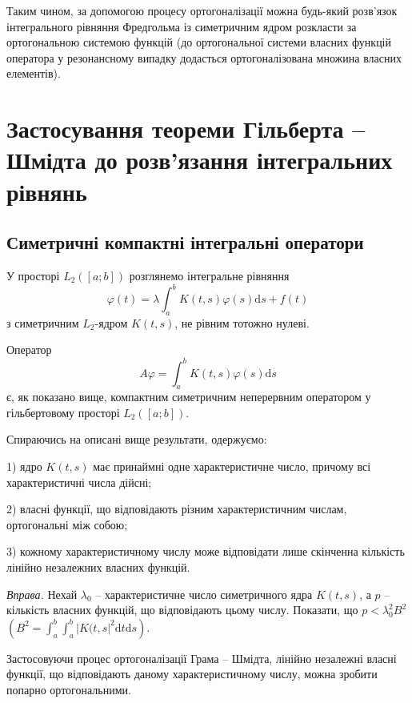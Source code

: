 \documentclass[14pt,twoside]{extreport}
\theoremstyle{mystyle}
\numberwithin{equation}{chapter}
\begin{document}
Таким чином, за допомогою процесу ортогоналізації можна будь-який розв'язок інтегрального рівняння Фредгольма із симетричним ядром розкласти за ортогональною системою функцій (до ортогональної системи власних функцій оператора у резонансному випадку додасться ортогоналізована множина власних елементів).

\chapter{Застосування теореми Гільберта -- Шмідта до розв'язання інтегральних рівнянь}

\section{Симетричні компактні інтегральні оператори}

У просторі $L_2([a; b])$ розглянемо інтегральне рівняння
\begin{equation}\label{fredhs}
 \varphi(t) = \lambda \int_{a}^{b} K(t, s) \varphi(s) \mathrm{d}s + f(t)
\end{equation}
з симетричним $L_2$-ядром $K(t, s)$, не рівним тотожно нулеві.

Оператор
\[
 A\varphi = \int_{a}^{b} K(t, s) \varphi(s) \mathrm{d}s
\]
є, як показано вище, компактним симетричним неперервним оператором у гільбертовому просторі $L_2([a; b])$.

Спираючись на описані вище результати, одержуємо:

1) ядро $K(t, s)$ має принаймні одне характеристичне число, причому всі характеристичні числа дійсні;

2) власні функції, що відповідають різним характеристичним числам, ортогональні між собою;

3) кожному характеристичному числу може відповідати лише скінченна кількість лінійно незалежних власних функцій.

\begin{small}
\emph{Вправа.} Нехай $\lambda_0$ -- характеристичне число симетричного ядра $K(t, s)$, а $p$ -- кількість власних функцій, що відповідають цьому числу. Показати, що $p < \lambda_0^2B^2$ $\left(B^2=\int_{a}^{b} \int_{a}^{b} |K(t, s|^2 \mathrm{d}t \mathrm{d}s\right)$.
\end{small}

Застосовуючи процес ортогоналізації Грама -- Шмідта, лінійно незалежні власні функції, що відповідають даному характеристичному числу, можна зробити попарно ортогональними.
\end{document}
